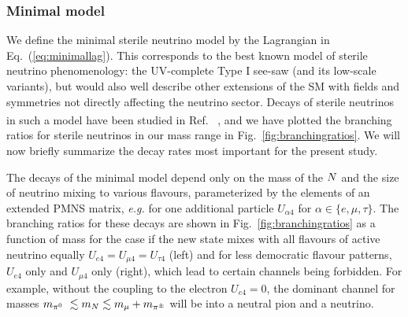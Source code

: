 \documentclass[11pt, a4paper]{article}
\newcommand{\refeq}[1]{Eq.~(\ref{#1})}
\newcommand{\reffig}[1]{Fig.~\ref{#1}}
\newcommand{\refref}[1]{Ref.~\cite{#1}}
\def\ster{\ensuremath N}
\newcounter{CommentCount}
\newcommand{\marcom}[2]{\textsuperscript{\textcolor{#1}{\theCommentCount}}\marginpar{\textsuperscript{\textcolor{#1}{\theCommentCount}}\textcolor{#1}{{\small#1: #2}}}\stepcounter{CommentCount}}
\begin{document}
%
%
%
%
\subsubsection{\label{sec:minimal}Minimal model}

We define the minimal sterile neutrino model by the Lagrangian in
\refeq{eq:minimallag}. This corresponds to the best known model of sterile
neutrino phenomenology: the UV-complete Type I see-saw (and its low-scale
variants), but would also well describe other extensions of the SM with fields
and symmetries not directly affecting the neutrino sector. Decays of sterile
neutrinos in such a model have been studied in \refref{Atre:2009rg}
\marcom{PB}{Others?}, and we have plotted the branching ratios for sterile
neutrinos in our mass range in \reffig{fig:branchingratios}. We will now
briefly summarize the decay rates most important for the present study.

The decays of the minimal model depend only on the mass of the
$\ster$ and the size of neutrino mixing to various flavours, parameterized by
the elements of an extended PMNS matrix, \emph{e.g.} for one additional
particle 
%
$U_{\alpha 4}$ for $\alpha \in \{e,\mu,\tau\}$. 
%
The branching ratios for these decays are shown in \reffig{fig:branchingratios}
as a function of mass for the case if the new state mixes with all flavours of
active neutrino equally $U_{e4}=U_{\mu 4}=U_{\tau 4}$ (left) and for less
democratic flavour patterns, $U_{e4}$ only and $U_{\mu 4}$ only (right), which 
lead to certain channels being forbidden. For example, without the coupling to the
electron $U_{e4}=0$, the dominant channel for masses $m_{\pi^0}~\lesssim
m_\ster \lesssim m_{\mu}+m_{\pi^\pm}$ will be into a neutral pion and a
neutrino.
\end{document}
